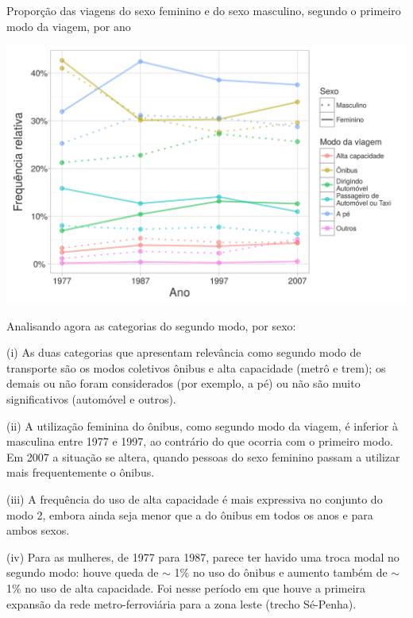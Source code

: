 \begin{grafico}[htb]%
    \caption{\label{graf:freq-modo1}Proporção das viagens do sexo feminino e do sexo masculino, segundo o primeiro modo da viagem, por ano}%
    \begin{center}%
        \includegraphics[width=1\textwidth]{./imagens/freq-modo1.png}%
    \end{center}%
\end{grafico}%

Analisando agora as categorias do segundo modo, por sexo:
\begin{compactitem}[]
\item (i)  As duas categorias que apresentam relevância como segundo modo de transporte são os modos coletivos ônibus e alta capacidade (metrô e trem); os demais ou não foram considerados (por exemplo, a pé) ou não são muito significativos (automóvel e outros).
\item (ii) A utilização feminina do ônibus, como segundo modo da viagem, é inferior à masculina entre 1977 e 1997, ao contrário do que ocorria com o primeiro modo. Em 2007 a situação se altera, quando pessoas do sexo feminino passam a utilizar mais frequentemente o ônibus.
\item (iii) A frequência do uso de alta capacidade é mais expressiva no conjunto do modo 2, embora ainda seja menor que a do ônibus em todos os anos e para ambos sexos.
\item(iv) Para as mulheres, de 1977 para 1987, parece ter havido uma troca modal no segundo modo: houve queda de $\sim$ 1\% no uso do ônibus e aumento também de $\sim$ 1\% no uso de alta capacidade. Foi nesse período em que houve a primeira expansão da rede metro-ferroviária para a zona leste (trecho Sé-Penha).
\end{compactitem}

